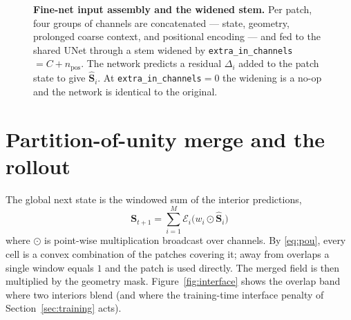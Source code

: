 \documentclass[11pt]{article}
\newcommand{\Rop}{\mathcal{R}}
\newcommand{\Eop}{\mathcal{E}}
\newcommand{\code}[1]{\texttt{#1}}
\begin{document}
\begin{figure}[t]
\centering
{}
\caption{\textbf{Fine-net input assembly and the widened stem.} Per patch, four
groups of channels are concatenated --- state, geometry, prolonged coarse context,
and positional encoding --- and fed to the shared UNet through a stem widened by
\code{extra\_in\_channels}$=C+n_{\text{pos}}$. The network predicts a residual
$\Delta_i$ added to the patch state to give $\hat{\bm S}_i$. At
\code{extra\_in\_channels}$=0$ the widening is a no-op and the network is identical
to the original.}
\label{fig:stem}
\end{figure}

\section{Partition-of-unity merge and the rollout}\label{sec:merge}

The global next state is the windowed sum of the interior predictions,
\begin{equation}
\boxed{\;\bm S_{t+1}=\sum_{i=1}^{M}\Eop_i\!\big(w_i\odot\hat{\bm S}_i\big)\;}
\label{eq:merge}
\end{equation}
where $\odot$ is point-wise multiplication broadcast over channels. By
\eqref{eq:pou}, every cell is a convex combination of the patches covering it;
away from overlaps a single window equals $1$ and the patch is used directly. The
merged field is then multiplied by the geometry mask. Figure~\ref{fig:interface}
shows the overlap band where two interiors blend (and where the training-time
interface penalty of Section~\ref{sec:training} acts).
\end{document}
